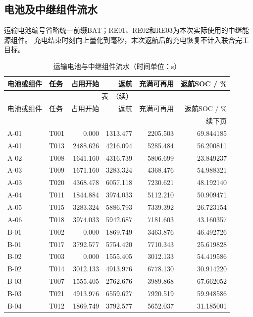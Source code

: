 \subsection{电池及中继组件流水}
运输电池编号省略统一前缀BAT；RE01、RE02和RE03为本次实际使用的中继能源组件。
充电结束时刻向上量化到毫秒，末次返航后的充电恢复不计入联合完工目标。
\begingroup
\small
\setlength{\tabcolsep}{3pt}
\renewcommand{\arraystretch}{1.10}
\begin{longtable}{@{}llrrrr@{}}
\caption{运输电池与中继组件流水（时间单位：s）}\label{tab:q3-batteries}\\
\toprule
电池或组件 & 任务 & 占用开始 & 返航 & 充满可再用 & 返航SOC / \% \\
\midrule
\endfirsthead
\multicolumn{6}{c}{\small 表~\thetable{}（续）}\\
\toprule
电池或组件 & 任务 & 占用开始 & 返航 & 充满可再用 & 返航SOC / \% \\
\midrule
\endhead
\midrule
\multicolumn{6}{r}{\small 续下页}\\
\endfoot
\bottomrule
\endlastfoot
A-01 & T001 & 0.000 & 1313.477 & 2205.503 & 69.844185 \\
A-01 & T013 & 2488.626 & 4216.094 & 5285.484 & 56.200811 \\
A-02 & T008 & 1641.160 & 4316.739 & 5806.699 & 23.849237 \\
A-03 & T009 & 1671.160 & 3283.324 & 4368.476 & 54.988321 \\
A-03 & T020 & 4368.478 & 6057.118 & 7230.621 & 48.192140 \\
A-04 & T011 & 1844.884 & 3974.033 & 5112.210 & 50.909471 \\
A-05 & T015 & 3283.324 & 5886.793 & 7339.392 & 26.723154 \\
A-06 & T018 & 3974.033 & 5942.687 & 7181.603 & 43.160357 \\
B-01 & T002 & 0.000 & 1869.749 & 3463.876 & 46.492726 \\
B-01 & T017 & 3792.577 & 5754.420 & 7710.343 & 25.619828 \\
B-02 & T003 & 0.000 & 1555.405 & 3012.133 & 54.419586 \\
B-02 & T014 & 3012.133 & 4913.976 & 6778.130 & 30.914220 \\
B-03 & T007 & 1555.405 & 2762.676 & 3989.868 & 67.662052 \\
B-03 & T021 & 4913.976 & 6559.627 & 7920.519 & 59.948586 \\
B-04 & T012 & 1869.749 & 3792.577 & 5652.037 & 31.185001 \\

\end{longtable}
